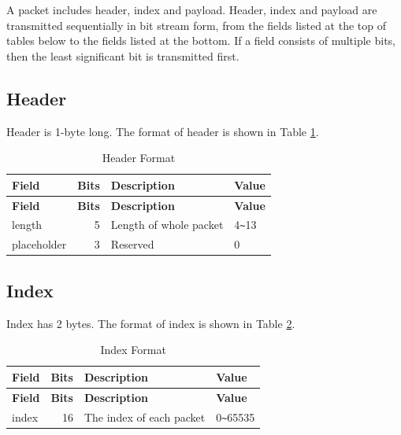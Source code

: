 \documentclass[main\_\_EN.tex]{subfiles}
\begin{document}
A packet includes header, index and payload. Header, index and payload are transmitted sequentially in bit stream form, from the fields listed at the top of tables below to the fields listed at the bottom. If a field consists of multiple bits, then the least significant bit is transmitted first.




\subsection{Header}

Header is 1-byte long. The format of header is shown in Table \ref{tab:header}.


\begin{longtable}[c]{ |l|r|l|l| }
    \caption{Header Format}
    \label{tab:header}
    \\\hline\rowcolor{lightgray}
    \textbf{Field} & \textbf{Bits} & \textbf{Description} & \textbf{Value}\\\hline
    \endfirsthead
    \textbf{Field} & \textbf{Bits} & \textbf{Description} & \textbf{Value}\\\hline
    \endhead
    \endfoot
    \endlastfoot

    length & 5 & Length of whole packet & 4\verb+~+13 \\\hline
    placeholder & 3 & Reserved & 0 \\\hline
 \end{longtable}


\subsection{Index}

Index has 2 bytes. The format of index is shown in Table \ref{tab:index}.

\begin{longtable}[c]{ |l|r|l|l| }
    \caption{Index Format}
    \label{tab:index}
    \\\hline\rowcolor{lightgray}
    \textbf{Field} & \textbf{Bits} & \textbf{Description} & \textbf{Value}\\\hline
    \endfirsthead
    \textbf{Field} & \textbf{Bits} & \textbf{Description} & \textbf{Value}\\\hline
    \endhead
    \endfoot
    \endlastfoot

    index & 16 & The index of each packet & 0\verb+~+65535 \\\hline
 \end{longtable}
\end{document}
